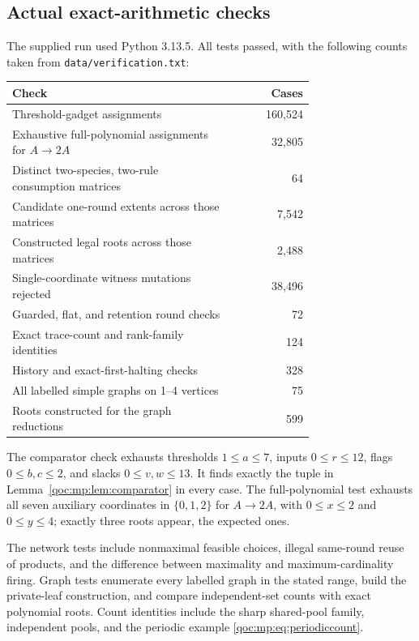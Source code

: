 \documentclass[11pt,letterpaper]{article}
\theoremstyle{definition}
\theoremstyle{remark}
\begin{document}
\subsection{Actual exact-arithmetic checks}
The supplied run used Python 3.13.5. All tests passed, with the following
counts taken from \texttt{data/verification.txt}:
\begin{center}
\begin{tabular}{@{}p{0.74\linewidth}r@{}}
\toprule
Check & Cases\\
\midrule
Threshold-gadget assignments & 160,524\\
Exhaustive full-polynomial assignments for $A\to2A$ & 32,805\\
Distinct two-species, two-rule consumption matrices & 64\\
Candidate one-round extents across those matrices & 7,542\\
Constructed legal roots across those matrices & 2,488\\
Single-coordinate witness mutations rejected & 38,496\\
Guarded, flat, and retention round checks & 72\\
Exact trace-count and rank-family identities & 124\\
History and exact-first-halting checks & 328\\
All labelled simple graphs on 1--4 vertices & 75\\
Roots constructed for the graph reductions & 599\\
\bottomrule
\end{tabular}
\end{center}

The comparator check exhausts thresholds $1\le a\le7$, inputs
$0\le r\le12$, flags $0\le b,c\le2$, and slacks $0\le v,w\le13$.
It finds exactly the tuple in Lemma~\ref{qoc:mp:lem:comparator} in every case.
The full-polynomial test exhausts all seven auxiliary coordinates in
$\{0,1,2\}$ for $A\to2A$, with $0\le x\le2$ and $0\le y\le4$; exactly
three roots appear, the expected ones.

The network tests include nonmaximal feasible choices, illegal
same-round reuse of products, and the difference between maximality and
maximum-cardinality firing. Graph tests enumerate every labelled graph in
the stated range, build the private-leaf construction, and compare
independent-set counts with exact polynomial roots. Count identities
include the sharp shared-pool family, independent pools, and the periodic
example \eqref{qoc:mp:eq:periodiccount}.
\end{document}
